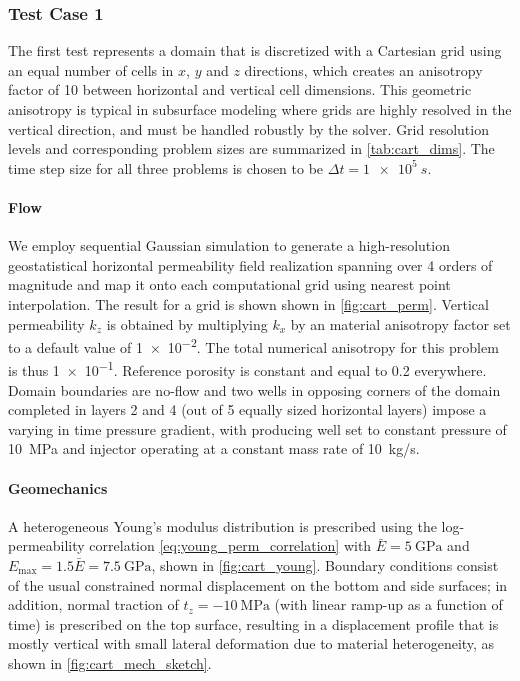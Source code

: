 \subsubsection{Test Case 1}

The first test represents a  domain that is discretized with a Cartesian grid using an equal number of cells in $x$, $y$ and $z$ directions, which creates an anisotropy factor of 10 between horizontal and vertical cell dimensions.   This geometric anisotropy is typical in subsurface modeling where grids are highly resolved in the vertical direction, and must be handled robustly by the solver.   Grid resolution levels and corresponding problem sizes are summarized in \cref{tab:cart_dims}.   The time step size for all three problems is chosen to be $\Delta t = \qty{1e5}{s}$.

\paragraph{Flow}
We employ sequential Gaussian simulation to generate a high-resolution geostatistical horizontal permeability field realization spanning over 4 orders of magnitude and map it onto each computational grid using nearest point interpolation. The result for a  grid is shown shown in \cref{fig:cart_perm}.   Vertical permeability $k_z$ is obtained by multiplying $k_x$ by an material anisotropy factor set to a default value of \num{1e-2}.   The total numerical anisotropy for this problem is thus \num{1e-1}.    Reference porosity is constant and equal to 0.2 everywhere.   Domain boundaries are no-flow and two wells in opposing corners of the domain completed in layers 2 and 4 (out of 5 equally sized horizontal layers)  impose a varying in time pressure gradient, with producing well set to constant pressure of \qty{10}{\MPa} and injector operating at a constant mass rate of \qty{10}{kg/s}.

\paragraph{Geomechanics}
A heterogeneous Young's modulus distribution is prescribed using the log-permeability correlation \cref{eq:young_perm_correlation} with $\bar{E} = \qty{5}{\GPa}$ and $E_{\max} = 1.5 \bar{E} = \qty{7.5}{\GPa}$, shown in \cref{fig:cart_young}.   Boundary conditions consist of the usual constrained normal displacement on the bottom and side surfaces; in addition, normal traction of $t_z = -\qty{10}{\MPa}$ (with linear ramp-up as a function of time) is prescribed on the top surface, resulting in a displacement profile that is mostly vertical with small lateral deformation due to material heterogeneity, as shown in \cref{fig:cart_mech_sketch}.

